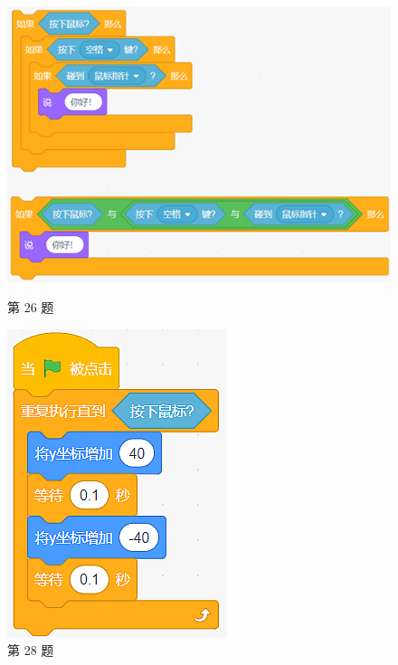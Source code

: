 \documentclass[10pt, a4paper]{article}
\begin{document}
\begin{enumerate}
\begin{figure}[htbp]
\begin{minipage}[t]{.26\textwidth}
                \includegraphics[width=\textwidth]{figure/26.png}
                \caption*{第 26 题}
            \end{minipage}
            \begin{minipage}[t]{.13\textwidth}
                \centering
                \includegraphics[width=\textwidth]{figure/28.png}
                \caption*{第 28 题}
            \end{minipage}
        \end{figure}


\end{enumerate}
\end{document}
